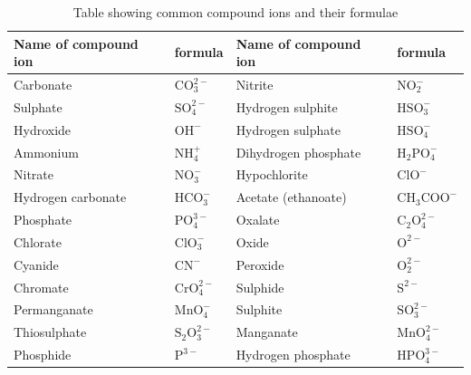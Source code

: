           \begin{table}[H]
        \begin{center}
      \label{m38689*uid99}
    \noindent
      \begin{tabular}{|l|l|l|l|}\hline
                  \textbf{Name of compound ion} &
                  \textbf{formula} &  \textbf{Name of compound ion} & \textbf{formula} \\ \hline
        Carbonate & $\mathrm{CO}_{3}^{2-}$ & Nitrite & $\mathrm{NO}_{2}^{-}$ \\ \hline
        Sulphate &  $\mathrm{SO}_{4}^{2-}$ & Hydrogen sulphite & $\mathrm{HSO}_{3}^{-}$ \\ \hline
        Hydroxide & ${\mathrm{OH}}^{-}$ & Hydrogen sulphate & $\mathrm{HSO}_{4}^{-}$ \\ \hline
        Ammonium & $\mathrm{NH}_{4}^{+}$ & Dihydrogen phosphate & ${\mathrm{H}}_{2}\mathrm{PO}_{4}^{-}$ \\ \hline
        Nitrate & $\mathrm{NO}_{3}^{-}$ & Hypochlorite & ${\mathrm{ClO}}^{-}$ \\ \hline
        Hydrogen carbonate & $\mathrm{HCO}_{3}^{-}$ & Acetate (ethanoate) & ${\mathrm{CH}}_{3}{\mathrm{COO}}^{-}$ \\ \hline
        Phosphate & $\mathrm{PO}_{4}^{3-}$ & Oxalate & ${\mathrm{C}}_{2}\mathrm{O}_{4}^{2-}$ \\ \hline
        Chlorate & $\mathrm{ClO}_{3}^{-}$ &  Oxide & ${\mathrm{O}}^{2-}$ \\ \hline
        Cyanide & ${\mathrm{CN}}^{-}$ & Peroxide & $\mathrm{O}_{2}^{2-}$ \\ \hline
        Chromate & $\mathrm{CrO}_{4}^{2-}$ & Sulphide & ${\mathrm{S}}^{2-}$ \\ \hline
        Permanganate & $\mathrm{MnO}_{4}^{-}$ & Sulphite & $\mathrm{SO}_{3}^{2-}$ \\ \hline
        Thiosulphate & ${\mathrm{S}}_{2}\mathrm{O}_{3}^{2-}$ & Manganate & $\mathrm{MnO}_{4}^{2-}$ \\ \hline
        Phosphide & ${\mathrm{P}}^{3-}$ & Hydrogen phosphate & $\mathrm{HPO}_{4}^{3-}$ \\ \hline
    \end{tabular}
      \end{center}
    \caption{Table showing common compound ions and their formulae}
\label{tab:ions}
\end{table}
    \par
	\par

